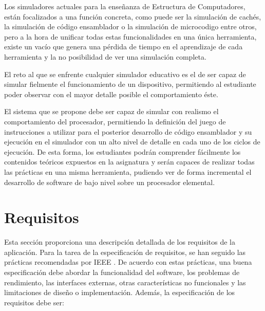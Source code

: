 Los simuladores actuales para la enseñanza de Estructura de Computadores, están focalizados a una función concreta, como puede ser la simulación de cachés, la simulación de código \gls{ensamblador} o la simulación de \gls{microcodigo} entre otros, pero a la hora de unificar todas estas funcionalidades en una única herramienta, existe un vacío que genera una pérdida de tiempo en el aprendizaje de cada herramienta y la no posibilidad de ver una simulación completa.

El reto al que se enfrente cualquier simulador educativo es el de ser capaz de simular fielmente el funcionamiento de un dispositivo, permitiendo al estudiante poder observar con el mayor detalle posible el comportamiento éste.

El sistema que se propone debe ser capaz de simular con realismo el comportamiento del procesador, permitiendo la definición del juego de instrucciones a utilizar para el posterior desarrollo de código \gls{ensamblador} y su ejecución en el simulador con un alto nivel de detalle en cada uno de los ciclos de ejecución. De esta forma, los estudiantes podrán comprender fácilmente los contenidos teóricos expuestos en la asignatura y serán capaces de realizar todas las prácticas en una misma herramienta, pudiendo ver de forma incremental el desarrollo de \gls{software} de bajo nivel sobre un procesador elemental.


\section{Requisitos}
\label{sec:requirements}

Esta sección proporciona una descripción detallada de los requisitos de la aplicación. Para la tarea de la especificación de requisitos, se han seguido las prácticas recomendadas por IEEE \cite{ieee1998}. De acuerdo con estas prácticas, una buena especificación debe abordar la funcionalidad del \gls{software}, los problemas de rendimiento, las interfaces externas, otras características no funcionales y las limitaciones de diseño o implementación.
Además, la especificación de los requisitos debe ser:

